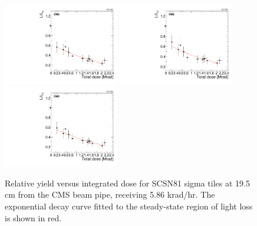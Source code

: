 \begin{figure}[tbp!]
\centering
\includegraphics[width=0.45\textwidth]{figures/SCSN81-S-19p5cm-f2ch1-dose.pdf}
\includegraphics[width=0.45\textwidth]{figures/SCSN81-S-19p5cm-f15ch1-dose.pdf}
\includegraphics[width=0.45\textwidth]{figures/SCSN81-S-19p5cm-f20ch4-dose.pdf}
\caption{Relative yield versus integrated dose for SCSN81 sigma tiles at 19.5 cm from the CMS beam pipe, receiving 5.86 krad/hr. The exponential decay curve fitted to the steady-state region of light loss is shown in red.}
\label{fig:SCSN81-S-19p5cm-dose}
\end{figure} 


